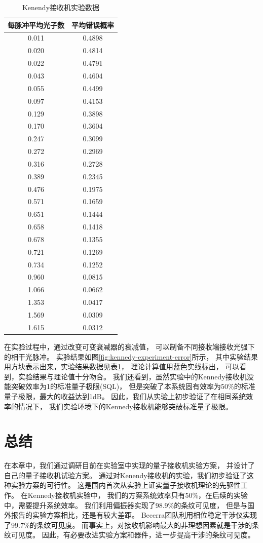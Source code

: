 \begin{table}
\caption{Kenendy接收机实验数据}
\label{tab:exp-data}
\centering
\begin{tabular}{cc}
\hline
每脉冲平均光子数 & 平均错误概率 \\
\hline
0.011 & 0.4898 \\ 
0.020 & 0.4814 \\ 
0.022 & 0.4791 \\ 
0.043 & 0.4604 \\ 
0.055 & 0.4499 \\ 
0.097 & 0.4153 \\ 
0.129 & 0.3898 \\ 
0.170 & 0.3604 \\ 
0.247 & 0.3099 \\ 
0.272 & 0.2969 \\ 
0.316 & 0.2728 \\ 
0.389 & 0.2345 \\ 
0.476 & 0.1975 \\ 
0.571 & 0.1659 \\ 
0.651 & 0.1444 \\ 
0.658 & 0.1418 \\ 
0.678 & 0.1355 \\ 
0.721 & 0.1269 \\ 
0.734 & 0.1252 \\ 
0.960 & 0.0815 \\ 
1.066 & 0.0662 \\ 
1.353 & 0.0417 \\ 
1.569 & 0.0309 \\ 
1.615 & 0.0312 \\ 
\hline
\end{tabular}
\end{table}


在实验过程中，通过改变可变衰减器的衰减值，
可以制备不同接收端接收光强下的相干光脉冲。
实验结果如图\ref{fig:kennedy-experiment-error}所示，
其中实验结果用方块表示出来，实验结果数据见表\ref{tab:exp-data}，
理论计算值用蓝色实线标出，
可以看到，实验结果与理论值十分吻合。
我们还看到，虽然实验中的Kennedy接收机没能突破效率为1的标准量子极限(SQL)，
但是突破了本系统固有效率为50\%的标准量子极限，最大的收益达到1dB。
因此，我们从实验上初步验证了在相同系统效率的情况下，
我们实验环境下的Kennedy接收机能够突破标准量子极限。


\section{总结}
在本章中，我们通过调研目前在实验室中实现的量子接收机实验方案，
并设计了自己的量子接收机试验方案。
通过对Kenendy接收机的实验，我们初步验证了这种实验方案的可行性。
这是国内首次从实验上证实量子接收机理论的先驱性工作。
在Kennedy接收机实验中，
我们的方案系统效率只有50\%，在后续的实验中，需要提升系统效率。
我们利用偏振器实现了98.9\%的条纹可见度，
但是与国外报告的实验方案相比，还是有较大差距。
Becerra团队利用相位稳定干涉仪实现了99.7\%的条纹可见度\cite{becerra2013experimental}。
而事实上，对接收机影响最大的非理想因素就是干涉的条纹可见度\cite{li2013suppressing}。
因此，有必要改进实验方案和器件，进一步提高干涉的条纹可见度。

